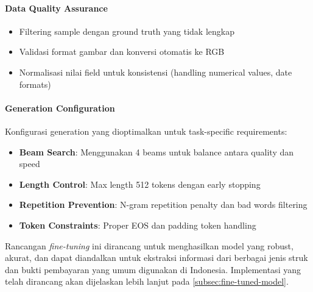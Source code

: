 \paragraph{Data Quality Assurance}
\begin{itemize}
    \item Filtering sample dengan ground truth yang tidak lengkap
    \item Validasi format gambar dan konversi otomatis ke RGB
    \item Normalisasi nilai field untuk konsistensi (handling numerical values, date formats)
\end{itemize}

\paragraph{Generation Configuration}
Konfigurasi generation yang dioptimalkan untuk task-specific requirements:
\begin{itemize}
    \item \textbf{Beam Search}: Menggunakan 4 beams untuk balance antara quality dan speed
    \item \textbf{Length Control}: Max length 512 tokens dengan early stopping
    \item \textbf{Repetition Prevention}: N-gram repetition penalty dan bad words filtering
    \item \textbf{Token Constraints}: Proper EOS dan padding token handling
\end{itemize}

Rancangan \emph{fine-tuning} ini dirancang untuk menghasilkan model yang robust, akurat, dan dapat diandalkan untuk ekstraksi informasi dari berbagai jenis struk dan bukti pembayaran yang umum digunakan di Indonesia. Implementasi yang telah dirancang akan dijelaskan lebih lanjut pada \autoref{subsec:fine-tuned-model}.